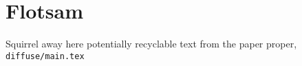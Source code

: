 
\section{Flotsam}
\label{s:flotsam}

Squirrel away here potentially recyclable text from the paper proper,
\texttt{diffuse/main.tex}
